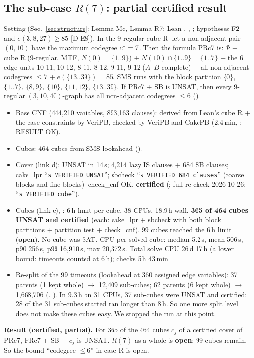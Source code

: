 \subsection{The sub-case \texorpdfstring{$R(7)$}{R(7)}: partial certified result}\label{sec:sat-r7}
Setting (Sec.~\ref{sec:structure}: Lemma Mc, Lemma R7; Lean , , ; hypotheses F2 and
$e(3,8,27) \ge 85$ [D-E8]). In the 9-regular cube R, let a non-adjacent pair $(0,10)$ have the maximum codegree
$c^{*} = 7$. Then the formula PRc7 is: $\Phi$ + cube R (9-regular, MTF, $N(0) = \{1..9\}$) + $N(10) \cap \{1..9\} = \{1..7\}$
+ the 6 edge units 10-11, 10-12, 8-11, 8-12, 9-11, 9-12 ($A$--$B$ complete) + all non-adjacent codegrees $\le 7$
+ $e(\{13..39\}) = 85$. SMS runs with the block partition $\{0\}$, $\{1..7\}$, $\{8,9\}$, $\{10\}$, $\{11,12\}$, $\{13..39\}$.
If PRc7 + SB is UNSAT, then every 9-regular $(3,10,40)$-graph has all non-adjacent codegrees $\le 6$
().
\begin{itemize}
\item Base CNF  (444,210 variables, 893,163 clauses): derived from Lean's cube R + the case
  constraints by VeriPB, checked by VeriPB and CakePB (2.4\,min, : RESULT OK).
\item Cubes: 464 cubes from SMS lookahead ().
\item Cover (link d): UNSAT in 14\,s; 4,214 lazy IS clauses + 684 SB clauses; cake\_lpr ``\texttt{s VERIFIED UNSAT}'';
  sbcheck ``\texttt{s VERIFIED 684 clauses}'' (coarse blocks and fine blocks); check\_cnf OK.
  \textbf{certified} (; full re-check 2026-10-26: ``\texttt{s VERIFIED cube}'').
\item Cubes (link e), : 6\,h limit per cube, 38 CPUs, 18.9\,h wall.
  \textbf{365 of 464 cubes UNSAT and certified} (each: cake\_lpr + sbcheck with both block partitions + partition
  test + check\_cnf). 99 cubes reached the 6\,h limit (\textbf{open}). No cube was SAT.
  CPU per solved cube: median 5.2\,s, mean 506\,s, p90 256\,s, p99 16,910\,s, max 20,372\,s. Total solve CPU
  26\,d 17\,h (a lower bound: timeouts counted at 6\,h); checks 5\,h 43\,min.
\item Re-split of the 99 timeouts (lookahead at 360 assigned edge variables): 37 parents (1 kept whole) $\to$ 12,409
  sub-cubes; 62 parents (6 kept whole) $\to$ 1,668,706 (, ). In 9.3\,h on 31 CPUs, 37 sub-cubes were UNSAT and certified;
  28 of the 31 sub-cubes started ran longer than 8\,h. So one more split level does not make these cubes
  easy. We stopped the run at this point.
\end{itemize}

\textbf{Result (certified, partial).} For 365 of the 464 cubes $c_j$ of a certified cover of PRc7, PRc7 + SB + $c_j$
is UNSAT. $R(7)$ as a whole is \textbf{open}: 99 cubes remain. So the bound ``codegree $\le 6$'' in case R is open.
